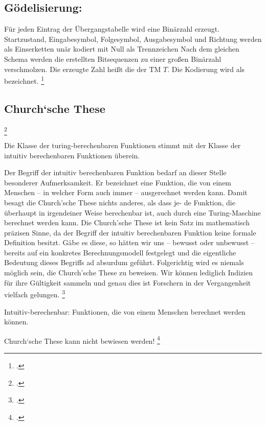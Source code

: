 \documentclass{lehramt-informatik-haupt}
\begin{document}
\subsection{Gödelisierung:}

Für jeden Eintrag der Übergangstabelle wird eine Binärzahl erzeugt.
Startzustand, Eingabesymbol, Folgesymbol, Ausgabesymbol und Richtung
werden als Einserketten unär kodiert mit Null als Trennzeichen Nach dem
gleichen Schema werden die erstellten Bitsequenzen zu einer großen
Binärzahl verschmolzen. Die erzeugte Zahl heißt die 
der TM $T$. Die Kodierung wird als  bezeichnet.
\footcite[Seite 23]{theo:fs:4}

\subsection{Church‘sche These}
\footcite{wiki:church-these}

Die Klasse der turing-berechenbaren Funktionen stimmt mit der
Klasse der intuitiv berechenbaren Funktionen überein.

Der Begriff der intuitiv berechenbaren Funktion bedarf an dieser Stelle
besonderer Aufmerksamkeit. Er bezeichnet eine Funktion, die von einem
Menschen – in welcher Form auch immer – ausgerechnet werden kann. Damit
besagt die Church’sche These nichts anderes, als dass je- de Funktion,
die überhaupt in irgendeiner Weise berechenbar ist, auch durch eine
Turing-Maschine berechnet werden kann. Die Church’sche These ist kein
Satz im mathematisch präzisen Sinne, da der Begriff der intuitiv
berechenbaren Funktion keine formale Definition besitzt. Gäbe es
diese, so hätten wir uns – bewusst oder unbewusst – bereits auf ein
konkretes Berechnungsmodell festgelegt und die eigentliche Bedeutung
dieses Begriffs ad absurdum geführt. Folgerichtig wird es niemals
möglich sein, die Church’sche These zu beweisen. Wir können lediglich
Indizien für ihre Gültigkeit sammeln und genau dies ist Forschern in der
Vergangenheit vielfach gelungen.
\footcite[Seite 308]{hoffmann}

Intuitiv-berechenbar:
Funktionen, die von einem Menschen berechnet werden können.

Church‘sche These kann nicht bewiesen werden!
\footcite[Seite 27]{theo:fs:4}
\end{document}
